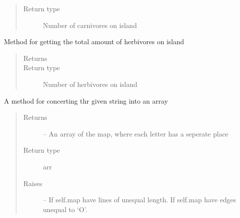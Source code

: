 \documentclass[a4paper,10pt,english]{sphinxmanual}
\begin{document}
\begin{fulllineitems}
\begin{fulllineitems}
\begin{quote}
\begin{description}
\item[{Return type}] \leavevmode
Number of carnivores on island

\end{description}\end{quote}

\end{fulllineitems}


\begin{fulllineitems}
\label{\detokenize{island:biosim.island.Island.number_of_herbivores_island}}
Method for getting the total amount of herbivores on island
\begin{quote}\begin{description}
\item[{Returns}] \leavevmode


\item[{Return type}] \leavevmode
Number of herbivores on island

\end{description}\end{quote}

\end{fulllineitems}


\begin{fulllineitems}
\label{\detokenize{island:biosim.island.Island.string_to_array}}
A method for concerting thr given string into an array
\begin{quote}\begin{description}
\item[{Returns}] \leavevmode
{} -- An array of the map, where each letter has a seperate place

\item[{Return type}] \leavevmode
arr

\item[{Raises}] \leavevmode
{} -- If self.map have lines of unequal length.
If self.map have edges unequal to `O'.

\end{description}\end{quote}

\end{fulllineitems}


\end{fulllineitems}
\end{document}
